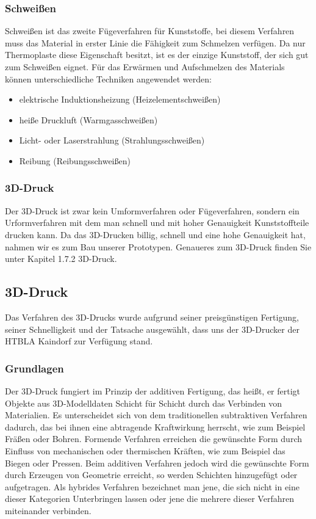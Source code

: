 \subsubsection{Schweißen}
Schweißen ist das zweite Fügeverfahren für Kunststoffe, bei diesem Verfahren muss das Material in erster Linie die
Fähigkeit zum Schmelzen verfügen. Da nur Thermoplaste diese Eigenschaft besitzt, ist es der einzige Kunststoff, der sich gut
zum Schweißen eignet. Für das Erwärmen und Aufschmelzen des Materials können unterschiedliche Techniken angewendet werden:
\begin{itemize}
    \item elektrische Induktionsheizung (Heizelementschweißen)
    \item heiße Druckluft (Warmgasschweißen)
    \item Licht- oder Laserstrahlung (Strahlungsschweißen)
    \item Reibung (Reibungsschweißen)
\end{itemize}

\subsubsection{3D-Druck}
Der 3D-Druck ist zwar kein Umformverfahren oder Fügeverfahren, sondern ein Urformverfahren mit dem man schnell und mit hoher Genauigkeit Kunststoffteile
drucken kann. Da das 3D-Drucken billig, schnell und eine hohe Genauigkeit hat, nahmen wir es zum Bau unserer Prototypen. Genaueres zum 3D-Druck finden
Sie unter Kapitel 1.7.2 3D-Druck.

\subsection{3D-Druck}
 Das Verfahren des 3D-Drucks wurde aufgrund seiner preisgünstigen Fertigung, seiner Schnelligkeit und der Tatsache
ausgewählt, dass uns der 3D-Drucker der HTBLA Kaindorf zur Verfügung stand.
\subsubsection{Grundlagen}
Der 3D-Druck fungiert im Prinzip der additiven Fertigung, das heißt, er fertigt Objekte aus 3D-Modelldaten Schicht für Schicht
durch das Verbinden von Materialien. Es unterscheidet sich von dem traditionellen subtraktiven Verfahren dadurch,
das bei ihnen eine abtragende Kraftwirkung herrscht, wie zum Beispiel Fräßen oder Bohren. Formende Verfahren
erreichen die gewünschte Form durch Einfluss von mechanischen oder thermischen Kräften, wie zum Beispiel das Biegen oder
Pressen. Beim additiven  Verfahren jedoch wird die gewünschte Form durch Erzeugen von Geometrie erreicht, so werden Schichten
hinzugefügt oder aufgetragen. Als hybrides Verfahren bezeichnet man jene, die sich nicht in eine dieser Kategorien
Unterbringen lassen oder jene die mehrere dieser Verfahren miteinander verbinden.

